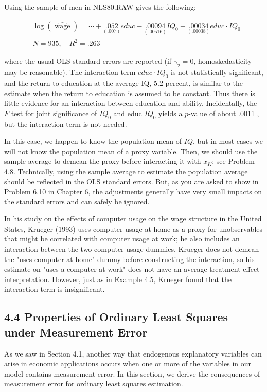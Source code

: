 \documentclass[10pt]{article}
\begin{document}
Using the sample of men in NLS80.RAW gives the following:

$$
\begin{aligned}
& \log (\widehat{\text { wage }})=\cdots+\underset{(.007)}{.052} e d u c-\underset{(.00516)}{.00094} I Q_{0}+\underset{(.00038)}{.00034} e d u c \cdot I Q_{0} \\
& N=935, \quad R^{2}=.263
\end{aligned}
$$

where the usual OLS standard errors are reported (if $\gamma_{2}=0$, homoskedasticity may be reasonable). The interaction term $e d u c \cdot I Q_{0}$ is not statistically significant, and the return to education at the average IQ, 5.2 percent, is similar to the estimate when the return to education is assumed to be constant. Thus there is little evidence for an interaction between education and ability. Incidentally, the $F$ test for joint significance of $I Q_{0}$ and educ $I Q_{0}$ yields a $p$-value of about .0011 , but the interaction term is not needed.

In this case, we happen to know the population mean of $I Q$, but in most cases we will not know the population mean of a proxy variable. Then, we should use the sample average to demean the proxy before interacting it with $x_{K}$; see Problem 4.8. Technically, using the sample average to estimate the population average should be reflected in the OLS standard errors. But, as you are asked to show in Problem 6.10 in Chapter 6, the adjustments generally have very small impacts on the standard errors and can safely be ignored.

In his study on the effects of computer usage on the wage structure in the United States, Krueger (1993) uses computer usage at home as a proxy for unobservables that might be correlated with computer usage at work; he also includes an interaction between the two computer usage dummies. Krueger does not demean the "uses computer at home" dummy before constructing the interaction, so his estimate on "uses a computer at work" does not have an average treatment effect interpretation. However, just as in Example 4.5, Krueger found that the interaction term is insignificant.

\subsection*{4.4 Properties of Ordinary Least Squares under Measurement Error}
As we saw in Section 4.1, another way that endogenous explanatory variables can arise in economic applications occurs when one or more of the variables in our model contains measurement error. In this section, we derive the consequences of measurement error for ordinary least squares estimation.
\end{document}
